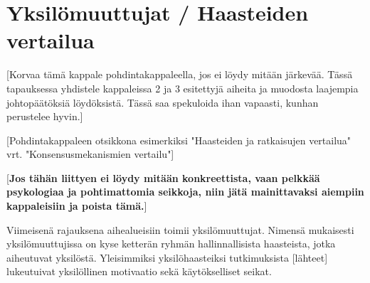 \chapter{Yksilömuuttujat / Haasteiden vertailua}

[Korvaa tämä kappale pohdintakappaleella, jos ei löydy mitään järkevää. Tässä tapauksessa yhdistele kappaleissa 2 ja 3 esitettyjä aiheita ja muodosta laajempia johtopäätöksiä löydöksistä. Tässä saa spekuloida ihan vapaasti, kunhan perustelee hyvin.]

[Pohdintakappaleen otsikkona esimerkiksi "Haasteiden ja ratkaisujen vertailua" vrt. "Konsensusmekanismien vertailu"]

[\textbf{Jos tähän liittyen ei löydy mitään konkreettista, vaan pelkkää psykologiaa ja pohtimattomia seikkoja, niin jätä mainittavaksi aiempiin kappaleisiin ja poista tämä.}]

Viimeisenä rajauksena aihealueisiin toimii yksilömuuttujat. Nimensä mukaisesti yksilömuuttujissa on kyse ketterän ryhmän hallinnallisista haasteista, jotka aiheutuvat yksilöstä. Yleisimmiksi yksilöhaasteiksi tutkimuksista [lähteet] lukeutuivat yksilöllinen motivaatio sekä käytökselliset seikat.

